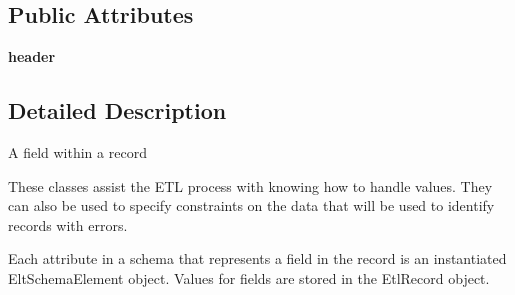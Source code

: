 \subsection*{Public Attributes}
\begin{DoxyCompactItemize}
\item 
\hypertarget{classetl_1_1schema_1_1EtlSchemaElement_1_1EtlSchemaElement_a471f578264e20df9962b2a3b4efbe2cc}{{\bfseries header}}\label{classetl_1_1schema_1_1EtlSchemaElement_1_1EtlSchemaElement_a471f578264e20df9962b2a3b4efbe2cc}

\end{DoxyCompactItemize}


\subsection{Detailed Description}
\begin{DoxyVerb}A field within a record

These classes assist the ETL process with knowing how to handle values.
They can also be used to specify constraints on the data that will be
used to identify records with errors.

Each attribute in a schema that represents a field in the record is an
instantiated EltSchemaElement object.  Values for fields are stored in the
EtlRecord object.
\end{DoxyVerb}
 


